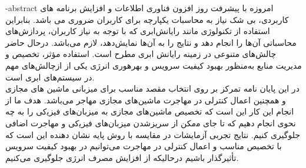 \fa-abstract{
اﻣﺮوزه ﺑﺎ ﭘﯿﺸﺮﻓﺖ روز اﻓﺰون ﻓﻨﺎوری اﻃﻼﻋﺎت و  اﻓﺰاﯾﺶ ﺑﺮﻧﺎﻣﻪ ﻫﺎی ﮐﺎرﺑﺮدی، ﺑﯽ شک ﻧﯿﺎز ﺑﻪ ﻣﺤﺎﺳﺒﺎت یکپارچه ﺑﺮای ﮐﺎرﺑﺮان ﺿﺮوری می ﺑﺎﺷﺪ. ﺑﻨﺎﺑﺮاﯾﻦ اﺳﺘﻔﺎده از ﺗﮑﻨﻮﻟﻮژی ﻣﺎﻧﻨﺪ راﯾﺎﻧﺶاﺑﺮی ﮐﻪ ﺑﺎ ﺗﻮﺟﻪ ﺑﻪ ﻧﯿﺎز ﮐﺎرﺑﺮان، ﭘﺮدازش‌ﻫﺎی ﻣﺤﺎﺳﺒﺎتی آن‌ﻫﺎ را اﻧﺠﺎم دﻫﺪ و ﻧﺘﺎﯾﺞ را ﺑﻪ آن‌ﻫﺎ ﻧﻤﺎﯾﺶدﻫﺪ، ﻻزم می‌باشد. درﺣﺎل ﺣﺎﺿﺮ ﭼﺎﻟﺶﻫﺎی ﻣﺘﻨﻮعی در زﻣﯿﻨﻪ راﯾﺎﻧﺶ اﺑﺮی ﻣﻄﺮح اﺳﺖ. استفاده مؤثر، ﺗﺨﺼﯿﺺ و مدیریت منابع به‌منظور بهبود کیفیت سرویس و بهره­وری انرژی یکی از ازﭼﺎﻟﺶﻫﺎی ﻣﻬﻢ در سیستم‌های ابری است.\\
در این پایان نامه تمرکز بر روی انتخاب مقصد مناسب برای میزبانی ماشین های مجازی و همچنین اعمال کنترلی در مهاجرت ماشین‌های مجازی مهاجر می‌باشد. هدف ما از انجام این کار این است ﮐﻪ ﺗﺨﺼﯿﺺ ﻣﺎﺷﯿﻦﻫﺎی ﻣﺠﺎزی ﺑﻪ ﻣﯿﺰﺑﺎنﻫﺎی ﻓﯿﺰﯾکی را ﺑﻪ ﭼﻪ ﻧﺤﻮی اﻧﺠﺎم دﻫﯿﻢ ﮐﻪ ﺗﺎ ﺟﺎی ﻣمکن از ﺳﺮﯾﺰﺷﺪن ﻣﯿﺰﺑﺎنﻫﺎی ﻓﯿﺰﯾکی و مهاجرت اضافی جلوگیری ﮐﻨﯿﻢ. نتایج تجربی آزمایشات در مقایسه با روش‌ پایه نشان دهنده این است که با تخصیص مناسب و اعمال کنترلی در مهاجرت می‌‌توانیم در بهبود کیفیت سرویس تأثیرگذار باشیم درحالیکه از افزایش مصرف انرژی جلوگیری می‌کنیم.
}





\newpage\clearpage

